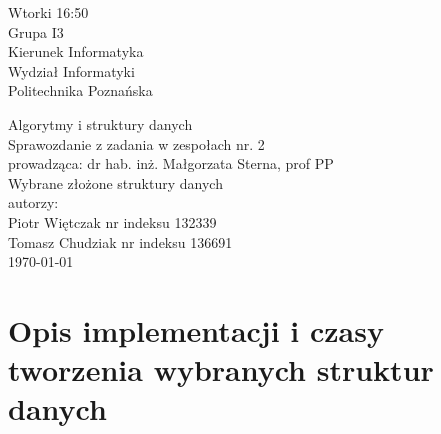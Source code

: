 \documentclass[polish,polish,a4paper]{article}
\begin{document}
	
\begin{spacing}{1.5}
		\begin{titlepage}
			\begin{flushright}
				{ Wtorki 16:50\\
					Grupa I3\\
					Kierunek Informatyka\\
					Wydział Informatyki\\
					Politechnika Poznańska}
			\end{flushright}
		\vspace*{\fill}
		\begin{center}
			{\Large Algorytmy i struktury danych \\[0.1cm]
				Sprawozdanie z zadania w zespołach nr. 2\\[0.1cm]
				prowadząca: dr hab. inż. Małgorzata Sterna, prof PP}\\
			{\Huge Wybrane złożone struktury danych\\ [0.4cm]}
			{\large autorzy:\\[0.1cm]}
			{\large Piotr Więtczak nr indeksu 132339\\[0.1cm] Tomasz Chudziak nr indeksu 136691}\\[0.5cm]
			\today
		\end{center}
		\vspace*{\fill}
	\end{titlepage}

\section{Opis implementacji i czasy tworzenia wybranych struktur danych}

\end{spacing}
\end{document}
